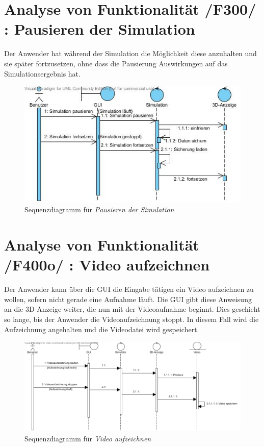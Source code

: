 \section{Analyse von Funktionalität /F300/ :  Pausieren der Simulation}
Der Anwender hat während der Simulation die Möglichkeit diese anzuhalten und sie später fortzusetzen, ohne dass die Pausierung Auswirkungen auf das Simulationsergebnis hat.
\begin{figure}
\includegraphics[width=\linewidth]{bilder/Pausieren.jpg}
\caption{Sequenzdiagramm für \textit{Pausieren der Simulation}}
\label{labelname}
\end{figure}

\section{Analyse von Funktionalität /F400o/ :  Video aufzeichnen}
Der Anwender kann über die GUI die Eingabe tätigen ein Video aufzeichnen zu wollen, sofern nicht gerade eine Aufnahme läuft. Die GUI gibt diese Anweisung an die 3D-Anzeige weiter, die nun mit der
Videoaufnahme beginnt. Dies geschieht so lange, bis der Anwender die Videoaufzeichnung stoppt. In diesem Fall wird die Aufzeichnung angehalten und die Videodatei wird gespeichert.


\begin{figure}
\includegraphics[width=16cm]{bilder/Video_aufzeichnen}
\caption{Sequenzdiagramm für \textit{Video aufzeichnen}}
\label{labelname}
\end{figure}

